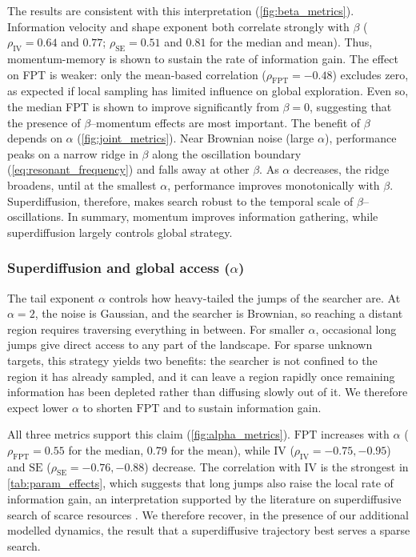 The results are consistent with this interpretation (\cref{fig:beta_metrics}). Information velocity and shape exponent both correlate strongly with $\beta$ ($\rho_{\mathrm{IV}} = 0.64$ and $0.77$; $\rho_{\mathrm{SE}} = 0.51$ and $0.81$ for the median and mean). Thus, momentum-memory is shown to sustain the rate of information gain. The effect on FPT is weaker: only the mean-based correlation ($\rho_{\mathrm{FPT}} = -0.48$) excludes zero, as expected if local sampling has limited influence on global exploration. Even so, the median FPT is shown to improve significantly from $\beta=0$, suggesting that the presence of $\beta$--momentum effects are most important. The benefit of $\beta$ depends on $\alpha$ (\cref{fig:joint_metrics}). Near Brownian noise (large $\alpha$), performance peaks on a narrow ridge in $\beta$ along the oscillation boundary (\cref{eq:resonant_frequency}) and falls away at other $\beta$. As $\alpha$ decreases, the ridge broadens, until at the smallest $\alpha$, performance improves monotonically with $\beta$. Superdiffusion, therefore, makes search robust to the temporal scale of $\beta$--oscillations. In summary, momentum improves information gathering, while superdiffusion largely controls global strategy.
\subsubsection*{Superdiffusion and global access ($\alpha$)}
The tail exponent $\alpha$ controls how heavy-tailed the jumps of the searcher are. At $\alpha = 2$, the noise is Gaussian, and the searcher is Brownian, so reaching a distant region requires traversing everything in between. For smaller $\alpha$, occasional long jumps give direct access to any part of the landscape. For sparse unknown targets, this strategy yields two benefits: the searcher is not confined to the region it has already sampled, and it can leave a region rapidly once remaining information has been depleted rather than diffusing slowly out of it. We therefore expect lower $\alpha$ to shorten $\mathrm{FPT}$ and to sustain information gain.




All three metrics support this claim (\cref{fig:alpha_metrics}). $\mathrm{FPT}$ increases with $\alpha$ ($\rho_{\mathrm{FPT}} = 0.55$ for the median, $0.79$ for the mean), while $\mathrm{IV}$ ($\rho_{\mathrm{IV}} = -0.75, -0.95$) and $\mathrm{SE}$ ($\rho_{\mathrm{SE}}=-0.76, -0.88$) decrease. The correlation with $\mathrm{IV}$ is the strongest in \cref{tab:param_effects}, which suggests that long jumps also raise the local rate of information gain, an interpretation supported by the literature on superdiffusive search of scarce resources \cite{gautestad_levy_2013, humphries_optimal_2014}. We therefore recover, in the presence of our additional modelled dynamics, the result that a superdiffusive trajectory best serves a sparse search.

